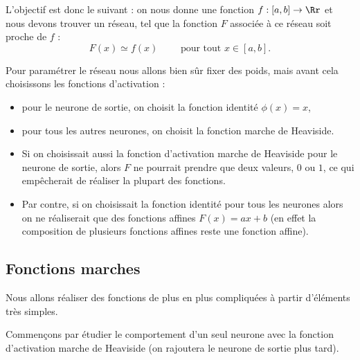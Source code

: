 \documentclass[11pt,class=report,crop=false]{standalone}
\begin{document}
L'objectif est donc le suivant : on nous donne une fonction $f : [a,b] \to \Rr$ et nous devons trouver un réseau, tel que la fonction $F$ associée à ce réseau soit proche de $f$ :
$$F(x) \simeq f(x) \qquad \text{ pour tout } x \in [a,b].$$

Pour paramétrer le réseau nous allons bien sûr fixer des poids, mais avant cela choisissons les fonctions d'activation :
\begin{itemize}
  \item pour le neurone de sortie, on choisit la fonction identité $\phi(x)=x$,
  \item pour tous les autres neurones, on choisit la fonction marche de Heaviside.
\end{itemize}


\begin{remarque*}
\sauteligne
\begin{itemize}
  \item Si on choisissait aussi la fonction d'activation marche de Heaviside pour le neurone de sortie, alors $F$ ne pourrait prendre que deux valeurs, $0$ ou $1$, ce qui empêcherait de réaliser la plupart des fonctions.
  
  \item Par contre, si on choisissait la fonction identité pour tous les neurones alors on ne réaliserait que des fonctions affines $F(x)=ax+b$ (en effet la composition de plusieurs fonctions affines reste une fonction affine). 

\end{itemize}
\end{remarque*}

\subsection{Fonctions marches}
\label{ssec:marches}

Nous allons réaliser des fonctions de plus en plus compliquées à partir d'éléments très simples.


Commençons par étudier le comportement d'un seul neurone avec la fonction d'activation marche de Heaviside (on rajoutera le neurone de sortie plus tard).
\end{document}
